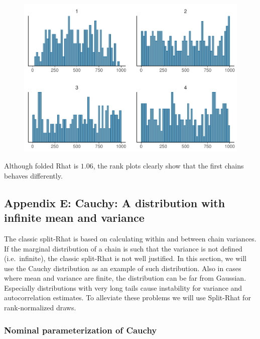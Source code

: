 \documentclass[american,]{article}
\begin{document}
\begin{figure}[tp]
  \centering
  \includegraphics[width=0.6\linewidth]{graphics/hist-scaled-chain-1.pdf}
\end{figure}

Although folded Rhat is \(1.06\), the rank plots clearly show that the
first chains behaves differently.

\hypertarget{AppendixE}{%
\subsection*{Appendix E: Cauchy: A distribution with infinite mean and
variance}\label{AppendixE}}

The classic split-Rhat is based on calculating within and between chain
variances. If the marginal distribution of a chain is such that the
variance is not defined (i.e.~infinite), the classic split-Rhat is not
well justified. In this section, we will use the Cauchy distribution as
an example of such distribution. Also in cases where mean and variance
are finite, the distribution can be far from Gaussian. Especially
distributions with very long tails cause instability for variance and
autocorrelation estimates. To alleviate these problems we will use
Split-Rhat for rank-normalized draws.


\hypertarget{nominal-parameterization-of-cauchy-1}{%
\subsubsection*{Nominal parameterization of
Cauchy}\label{nominal-parameterization-of-cauchy-1}}
\end{document}
